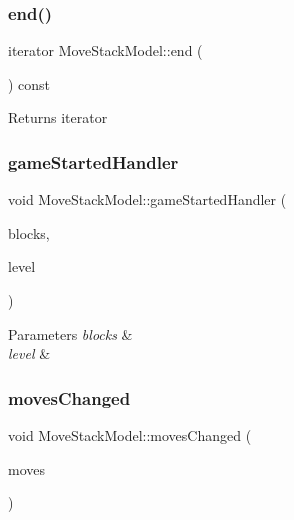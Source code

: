 \subsubsection{\texorpdfstring{end()}{end()}}
{\footnotesize\ttfamily iterator Move\+Stack\+Model\+::end (\begin{DoxyParamCaption}{ }\end{DoxyParamCaption}) const\hspace{0.3cm}{\ttfamily [inline]}}

\begin{DoxyReturn}{Returns}
iterator 
\end{DoxyReturn}
\mbox{\label{class_move_stack_model_a8340fbe17638209c13250962fd4e2ff3}} 
\subsubsection{\texorpdfstring{gameStartedHandler}{gameStartedHandler}}
{\footnotesize\ttfamily void Move\+Stack\+Model\+::game\+Started\+Handler (\begin{DoxyParamCaption}\item[{const std\+::vector$<$ std\+::shared\+\_\+ptr$<$ \mbox{\hyperlink{class_block}{Block}}$<$ \mbox{\hyperlink{class_block_layout_item}{Block\+Layout\+Item}} $>$$>$$>$ \&}]{blocks,  }\item[{const size\+\_\+t \&}]{level }\end{DoxyParamCaption})\hspace{0.3cm}{\ttfamily [slot]}}


\begin{DoxyParams}{Parameters}
{\em blocks} & \\
\hline
{\em level} & \\
\hline
\end{DoxyParams}
\mbox{\label{class_move_stack_model_aff05dc88104b96911f9cf8a1033d4356}} 
\subsubsection{\texorpdfstring{movesChanged}{movesChanged}}
{\footnotesize\ttfamily void Move\+Stack\+Model\+::moves\+Changed (\begin{DoxyParamCaption}\item[{const size\+\_\+t \&}]{moves }\end{DoxyParamCaption})\hspace{0.3cm}{\ttfamily [signal]}}


